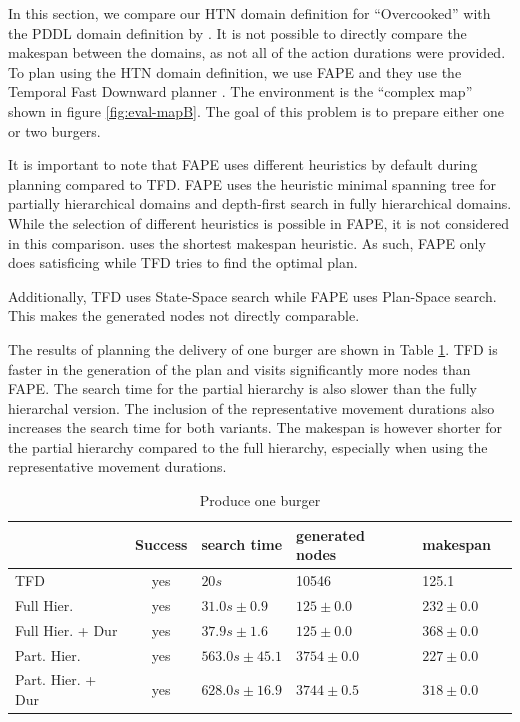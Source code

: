 In this section, we compare our HTN domain definition for ``Overcooked'' with the PDDL domain definition by \cite{yuxinliuPlanningOvercookedGame2020}.
It is not possible to directly compare the makespan between the domains, as not all of the action durations were provided.
To plan using the HTN domain definition, we use FAPE \citep{bit-monnotTemporalHierarchicalModels2016a} and they use the Temporal Fast Downward planner \citep{eyerichUsingContextenhancedAdditive2009}.
The environment is the ``complex map'' shown in figure \ref{fig:eval-mapB}.
The goal of this problem is to prepare either one or two burgers.


It is important to note that FAPE uses different heuristics by default during planning compared to TFD.
FAPE uses the heuristic minimal spanning tree for partially hierarchical domains and depth-first search in fully hierarchical domains.
While the selection of different heuristics is possible in FAPE, it is not considered in this comparison.
\cite{yuxinliuPlanningOvercookedGame2020} uses the shortest makespan heuristic.
As such, FAPE only does satisficing while TFD tries to find the optimal plan.

Additionally, TFD uses State-Space search while FAPE uses Plan-Space search.
This makes the generated nodes not directly comparable.

The results of planning the delivery of one burger are shown in Table \ref{tab:eval-burger}.
TFD is faster in the generation of the plan and visits significantly more nodes than FAPE.
The search time for the partial hierarchy is also slower than the fully hierarchal version.
The inclusion of the representative movement durations also increases the search time for both variants.
The makespan is however shorter for the partial hierarchy compared to the full hierarchy, especially when using the representative movement durations.


\begin{table}
  \centering
  \begin{tabular}{lcllll}
                   & Success & search time  & generated nodes & makespan         \\
    \hline
    TFD             & yes & $20s$            &  10546          &  125.1       \\
    Full Hier.            & yes & $31.0s\pm 0.9$   & $125\pm 0.0$    &  $232\pm 0.0$            \\
    Full Hier. + Dur      & yes & $37.9s\pm 1.6$   & $125\pm 0.0$    &  $368\pm 0.0$      \\
    Part. Hier.      & yes & $563.0s\pm 45.1$ & $3754\pm 0.0$   &  $227\pm 0.0$   \\
    Part. Hier. + Dur & yes & $628.0s\pm 16.9$ & $3744\pm 0.5$   &  $318\pm 0.0$            \\
  \end{tabular}
  \caption{Produce one burger}
  \label{tab:eval-burger}
\end{table}

